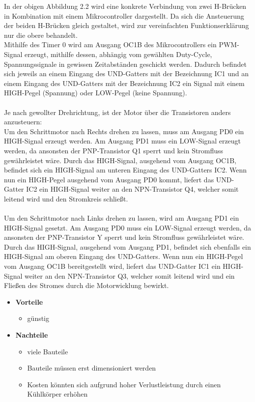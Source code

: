In der obigen Abbildung 2.2 wird eine konkrete Verbindung von zwei H-Brücken in Kombination mit einem Mikrocontroller dargestellt.
Da sich die Ansteuerung der beiden H-Brücken gleich gestaltet, wird zur vereinfachten Funktionserklärung nur die obere behandelt. \\
Mithilfe des Timer 0 wird am Ausgang OC1B des Mikrocontrollers ein PWM-Signal erzeugt, mithilfe dessen, abhängig vom gewählten Duty-Cycle, Spannungssignale in gewissen Zeitabständen geschickt werden.
Dadurch befindet sich jeweils an einem Eingang des UND-Gatters mit der Bezeichnung IC1 und an einem Eingang des UND-Gatters mit der Bezeichnung IC2 ein Signal mit einem HIGH-Pegel (Spannung) oder
LOW-Pegel (keine Spannung). \\\\
Je nach gewollter Drehrichtung, ist der Motor über die Transistoren anders anzusteuern: \\
Um den Schrittmotor nach Rechts drehen zu lassen, muss am Ausgang PD0 ein HIGH-Signal erzeugt werden.
Am Ausgang PD1 muss ein LOW-Signal erzeugt werden, da ansonsten der PNP-Transistor Q1 sperrt und kein Stromfluss gewährleistet wäre.
Durch das HIGH-Signal, ausgehend vom Ausgang OC1B, befindet sich ein HIGH-Signal am unteren Eingang des UND-Gatters IC2.
Wenn nun ein HIGH-Pegel ausgehend vom Ausgang PD0 kommt, liefert das UND-Gatter IC2 ein HIGH-Signal weiter an den NPN-Transistor Q4, welcher somit leitend wird und den Stromkreis schließt. \\\\
Um den Schrittmotor nach Links drehen zu lassen, wird am Ausgang PD1 ein HIGH-Signal gesetzt.
Am Ausgang PD0 muss ein LOW-Signal erzeugt werden, da ansonsten der PNP-Transistor Y sperrt und kein Stromfluss gewährleistet wäre.
Durch das HIGH-Signal, ausgehend vom Ausgang PD1, befindet sich ebenfalls ein HIGH-Signal am oberen Eingang des UND-Gatters.
Wenn nun ein HIGH-Pegel vom Ausgang OC1B bereitgestellt wird, liefert das UND-Gatter IC1 ein HIGH-Signal weiter an den NPN-Transistor Q3, welcher somit leitend wird und
ein Fließen des Stromes durch die Motorwicklung bewirkt.

\begin{itemize}
\item \textbf{Vorteile}
\begin{itemize}
\item günstig
\end{itemize}
\item \textbf{Nachteile}
\begin{itemize}
\item viele Bauteile
\item Bauteile müssen erst dimensioniert werden
\item Kosten könnten sich aufgrund hoher Verlustleistung durch einen Kühlkörper erhöhen
\end{itemize}
\end{itemize}

